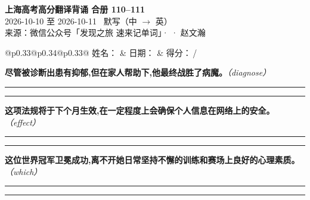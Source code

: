 \documentclass[11pt,a4paper]{article}
\newcommand{\num}[1]{\makebox[1.9em][r]{#1.}\hspace{0.3em}}
\newcommand{\wline}{\noindent\rule{\linewidth}{0.4pt}}
\newcommand{\prompt}[1]{\emph{\textcolor{tipblue}{\small（#1）}}}
\begin{document}
\pagestyle{plain}
\begin{center}
{\LARGE\bfseries 上海高考高分翻译背诵 \quad 合册 110–111}\\[0.25em]
{\large 2026-10-10 至 2026-10-11 \quad\ 默写（中 $\to$ 英）}\\[0.35em]
{\footnotesize 来源：微信公众号「发现之旅 速来记单词」·  · 赵文瀚}
\end{center}

\vspace{0.4em}
\noindent\begin{tabular}{@{}p{0.33\textwidth}@{}p{0.34\textwidth}@{}p{0.33\textwidth}@{}}
姓名：\underline{\hspace{2.0cm}} & 日期：\underline{\hspace{2.0cm}} & 得分：\underline{\hspace{1.4cm}}\,/ \\
\end{tabular}

\vspace{0.5em}

\vspace{0.8em}
\vspace{0.35em}\vspace{0.15em}

\begin{minipage}{\linewidth}

\num{1}\textbf{尽管被诊断出患有抑郁,但在家人帮助下,他最终战胜了病魔。}\prompt{diagnose}

\vspace{0.3em}

\wline\vspace{0.3em}
\wline

\end{minipage}

\begin{minipage}{\linewidth}

\num{2}\textbf{这项法规将于下个月生效,在一定程度上会确保个人信息在网络上的安全。}\prompt{effect}

\vspace{0.3em}

\wline\vspace{0.3em}
\wline

\end{minipage}

\begin{minipage}{\linewidth}

\num{3}\textbf{这位世界冠军卫冕成功,离不开她日常坚持不懈的训练和赛场上良好的心理素质。}\prompt{which}

\vspace{0.3em}

\wline\vspace{0.3em}
\wline

\end{minipage}
\end{document}
